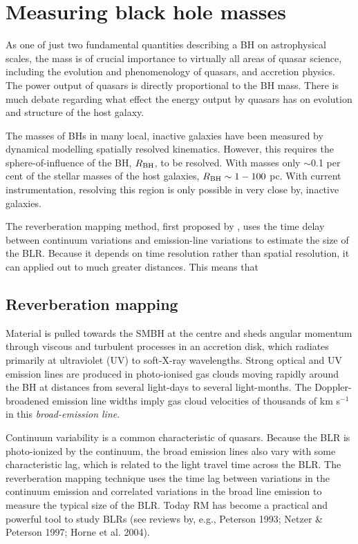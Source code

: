 \section{Measuring black hole masses}

As one of just two fundamental quantities describing a BH on astrophysical scales, the mass is of crucial importance to virtually all areas of quasar science, including the evolution and phenomenology of quasars, and accretion physics.
The power output of quasars is directly proportional to the BH mass. 
There is much debate regarding what effect the energy output by quasars has on evolution and structure of the host galaxy. 

The masses of BHs in many local, inactive galaxies have been measured by dynamical modelling spatially resolved kinematics. 
However, this requires the sphere-of-influence of the BH, $R_{\rm BH}$, to be resolved. 
With masses only $\sim$0.1 per cent of the stellar masses of the host galaxies, $R_{\rm BH}\sim1-100$ pc.
With current instrumentation, resolving this region is only possible in very close by, inactive galaxies. 

The reverberation mapping method, first proposed by \citet{blanford82}, uses the time delay between continuum variations and emission-line variations to estimate the size of the BLR. 
Because it depends on time resolution rather than spatial resolution, it can applied out to much greater distances. 
This means that 

\subsection{Reverberation mapping}

Material is pulled towards the SMBH at the centre and sheds angular momentum through viscous and turbulent processes in an accretion disk, which radiates primarily at ultraviolet (UV) to soft-X-ray wavelengths. 
Strong optical and UV emission lines are produced in photo-ionised gas clouds moving rapidly around the BH at distances from several light-days to several light-months.
The Doppler-broadened emission line widths imply gas cloud velocities of thousands of km s$^{-1}$ in this {\it broad-emission line}. 

Continuum variability is a common characteristic of quasars. 
Because the BLR is photo-ionized by the continuum, the broad emission lines also vary with some characteristic lag, which is related to the light travel time across the BLR. 
The reverberation mapping technique uses the time lag between variations in the continuum emission and correlated variations in the broad line emission to measure the typical size of the BLR. 
Today RM has become a practical and powerful tool to study BLRs (see reviews by, e.g., Peterson 1993; Netzer \& Peterson 1997; Horne et al. 2004). 

